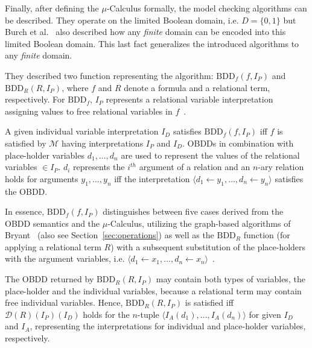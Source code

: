 \documentclass{vldb}
\begin{document}
Finally, after defining the $\mu$-Calculus formally, the model checking algorithms
can be described. They operate on the limited Boolean domain, i.e.
$D = \lbrace 0, 1 \rbrace$ but Burch et al.~\cite{BURCH90} also described how any
\textit{finite} domain can be encoded into this limited Boolean domain. This last
fact generalizes the introduced algorithms to any \textit{finite} domain.

They described two function representing the algorithm:
$\text{BDD}_f \left( f, I_P \right)$ and $\text{BDD}_R \left( R, I_P \right)$,
where $f$ and $R$ denote a formula and a relational term, respectively. For 
$\text{BDD}_f$, $I_P$ represents a relational variable interpretation assigning
values to free relational variables in $f$~\cite{BURCH90}.

A given individual variable interpretation $I_D$ satisfies \newline
$\text{BDD}_f \left( f, I_P \right)$ iff $f$ is satisfied by $\mathcal{M}$ having
interpretations $I_P$ and $I_D$. OBDDs in combination with place-holder variables
$d_1, \ldots, d_n$ are used to represent the values of the relational variables
$\in I_P$. $d_i$ represents the $i^{th}$ argument of a relation and an $n$-ary
relation holds for arguments $y_1, \ldots, y_n$ iff the interpretation
$\langle d_1 \leftarrow y_1, \ldots, d_n \leftarrow y_n \rangle$ satisfies the
OBDD.

In essence, $\text{BDD}_f \left( f, I_P \right)$ distinguishes between five cases
derived from the OBDD semantics and the $\mu$-Calculus, utilizing the graph-based
algorithms of Bryant~\cite{BRYANT86} (also see Section~\ref{sec:operations}) as
well as the $\text{BDD}_R$ function (for applying a relational term $R$) with a
subsequent substitution of the place-holders with the argument variables, i.e.
$\langle d_1 \leftarrow x_1, \ldots, d_n \leftarrow x_n \rangle$~\cite{BURCH90}.

The OBDD returned by $\text{BDD}_R \left( R, I_P \right)$ may contain both types
of variables, the place-holder and the individual variables, because a relational
term may contain free individual variables. Hence,
$\text{BDD}_R \left( R, I_P \right)$ is satisfied iff
$\mathcal{D} \left( R \right) \left( I_P \right) \left( I_D \right)$ holds for
the $n$-tuple $\langle I_A \left( d_1 \right), \ldots, I_A \left( d_n \right) \rangle$
for given $I_D$ and $I_A$, representing the interpretations for individual and
place-holder variables, respectively. 
\end{document}
